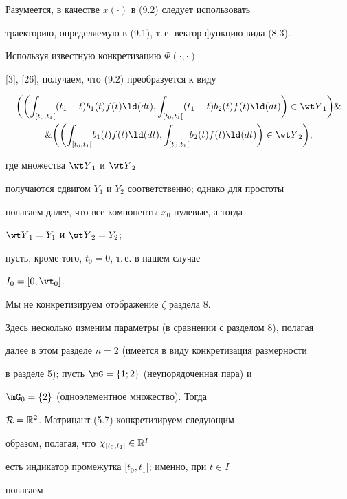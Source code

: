 Разумеется, в качестве $x(\cdot)$ в (9.2) следует использовать


траекторию, определяемую в (9.1), т.\,е. вектор-функцию вида (8.3).


Используя известную конкретизацию ${\Phi}(\cdot,\cdot)$


[3], [26], получаем, что (9.2) преобразуется к виду


\begin{multline*}


\bigg(\bigg({\int_{[{t_0},{t_1}[}}({t_1} - t){{b_1}(t)}{f(t)}{\ld}(dt),


{\int_{[{t_0},{t_1}[}}({t_1} - t){{b_2}(t)}{f(t)}{\ld}(dt)\bigg) \in


{{\wt Y}_1}\bigg) \&\\


\& \bigg(\bigg({\int_{[{t_0},{t_1}[}}{{b_1}(t)}{f(t)}{\ld}(dt),


{\int_{[{t_0},{t_1}[}}{{b_2}(t)}{f(t)}{\ld}(dt)\bigg) \in {{\wt Y}_2}\bigg),


\end{multline*}


где множества ${{\wt Y}_1}$ и ${{\wt Y}_2}$


получаются сдвигом $Y_1$ и ${Y_2}$ соответственно; однако для простоты


полагаем далее, что все компоненты $x_0$ нулевые, а тогда


${{\wt Y}_1} = {Y_1}$ и ${{\wt Y}_2} = {Y_2}$;


пусть, кроме того, ${t_0} = 0$, т.\,е. в нашем случае


${I_0} = [0,{{\vt}_0}]$.


Мы не конкретизируем отображение $\zeta$ раздела 8.


Здесь несколько изменим параметры (в сравнении с разделом 8), полагая


далее в этом разделе $n = 2$ (имеется в виду конкретизация размерности


в разделе 5); пусть $\mG = \{1;2\}$ (неупорядоченная пара) и


${{\mG}_0} = \{2\}$ (одноэлементное множество). Тогда


${\cal R} = {{\Bbb R}^2}$. Матрицант (5.7) конкретизируем следующим


образом, полагая, что ${{\chi}_{[{t_0},{t_1}[}} \in {{\Bbb R}^I}$


есть индикатор промежутка $[{t_0},{t_1}[$; именно, при $t \in I$


полагаем


